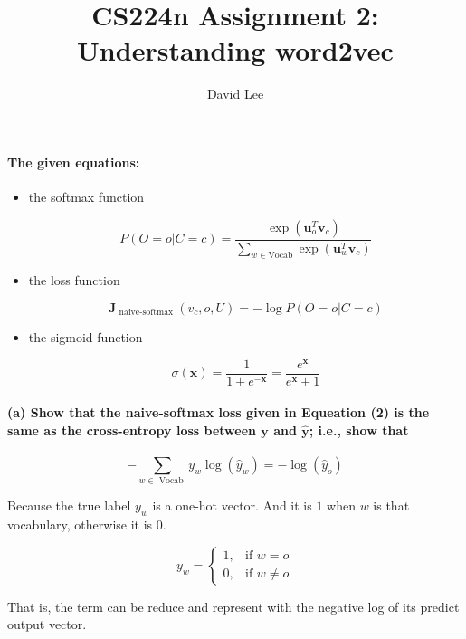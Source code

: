 \documentclass[12pt, letterpaper]{article}
\title{CS224n Assignment 2: \\ Understanding word2vec}
\author{David Lee}
\newcommand{\uxvc}[1]{\boldsymbol{u}_{#1}^{T} \boldsymbol{v}_{c}}
\newcommand{\expuxvc}[1]{\exp {\left(\uxvc{#1}\right)}}
\newcommand{\softmax}{\frac{\expuxvc{o}}{\sum_{w \in \mathrm{Vocab}} \expuxvc{w}}}
\newcommand{\Jsoftmax}{\boldsymbol{J}_{\text { naive-softmax }}\left(v_{c}, o, U\right)} %
\newcommand{\loss}{-\log P(O=o | C=c)}
\begin{document}
\maketitle

\paragraph{The given equations:}
\begin{itemize}
    \item {
        the softmax function

        \begin{equation}
            P(O=o | C=c)=\softmax
        \end{equation}
    }
    \item {
        the loss function

        \begin{equation}
            \Jsoftmax=\loss
        \end{equation}
    }
    \item {
        the sigmoid function

        \begin{equation}
            \sigma(\boldsymbol{x})=\frac{1}{1+e^{-\boldsymbol{x}}}=\frac{e^{\boldsymbol{x}}}{e^{\boldsymbol{x}}+1}
        \end{equation}
    }
\end{itemize}


\paragraph{(a) Show that the naive-softmax loss given in Equeation (2) is the same as the cross-entropy loss between $\boldsymbol{y}$ and $\hat{\boldsymbol{y}}$; i.e., show that}
\begin{equation}
    -\sum_{w \in \text{ Vocab }} y_{w} \log \left(\hat{y}_{w}\right)=-\log \left(\hat{y}_{o}\right)
\end{equation}

Because the true label $y_w$ is a one-hot vector. And it is $1$ when $w$ is that vocabulary, otherwise it is $0$.

$$
y_w =
\begin{cases}
1, & \mbox{if } w = o \\
0, & \mbox{if } w \neq o
\end{cases}
$$

That is, the term can be reduce and represent with the negative log of its predict output vector.
\end{document}
